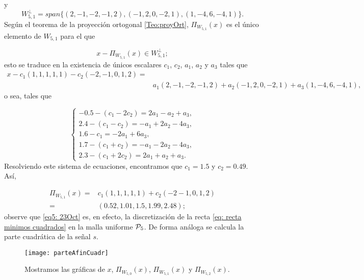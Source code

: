 \begin{ej}
y 
\[
W_{5,1}^{\perp}=span\{ (2,-1,-2,-1,2), (-1,2,0,-2,1), (1,-4,6,-4,1)\}.
\]
Según el teorema de la proyección ortogonal \ref{Teo:proyOrt},
$\Pi_{W_{5,1}}(x)$ es el único elemento de $W_{5,1}$ para el 
que 

\[
x-\Pi_{W_{5,1}}(x) \in W_{5,1}^{\perp};
\]
esto se 
traduce en la existencia de 
únicos escalares $c_{1}$, $c_{2}$,
$a_{1}$, $a_{2}$ y $a_{3}$ tales que
\begin{align*}
x-c_{1}(1,1,1,1,1)-c_{2}(-2, -1, 0, 1, 2)
= &\\
&  a_{1}(2,-1,-2,-1,2)+a_{2}(-1,2,0,-2,1)
+ a_{3}(1,-4,6,-4,1),
\end{align*}
\noindent
o sea, tales que

\begin{equation*}
\begin{cases}
-0.5-(c_{1}-2c_{2})=2a_{1}-a_{2}+a_{3}, \\
2.4-(c_{1}-c_{2})=-a_{1}+2a_{2}-4a_{3}, \\
1.6-c_{1}=-2a_{1}+6a_{3},\\
1.7-(c_{1}+c_{2})=-a_{1}-2a_{2}-4a_{3}, \\
2.3-(c_{1}+2c_{2})=2a_{1}+a_{2}+a_{3}.
\end{cases}
\end{equation*}
Resolviendo este sistema
de ecuaciones, encontramos que
$c_{1}=1.5$ y $c_{2}=0.49$. Así,




\begin{align}
\label{eq5: 23Oct}
\Pi_{W_{5,1}}(x) =& c_{1} (1,1,1,1,1) + c_{2}(-2-1,0,1,2) \nonumber \\
= & (0.52, 1.01, 1.5, 1.99, 2.48 );
\end{align}
observe que \eqref{eq5: 23Oct} es, 
en efecto, la discretización de 
la recta \eqref{eq: recta minimos cuadrados}
en la malla uniforme $\mathcal{P}_{5}$.
De forma análoga se calcula la parte cuadrática de
la señal $s$.


	\begin{figure}[H]
	\centering
	\texttt{[image: parteAfinCuadr]}
		\caption{Mostramos las gráficas de $x$, 
		$\Pi_{W_{5,0}}(x)$, $\Pi_{W_{5,1}}(x)$ y $\Pi_{W_{5,2}}(x)$.}
	\end{figure}	
\final
\end{ej}




